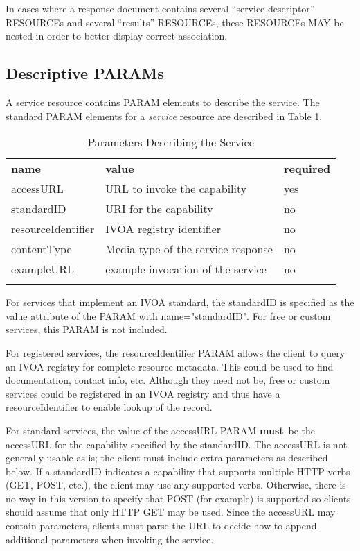 \documentclass[11pt,a4paper]{ivoa}
\newcommand{\attval}[2]{#1={\allowbreak}{"}#2{"}}
\newcommand{\rfcmust}{\textbf{must}}
\begin{document}
In cases where a response document contains several ``service descriptor'' RESOURCEs
and several ``results'' RESOURCEs, these RESOURCEs MAY be nested in
order to better display correct association.

\subsection{Descriptive PARAMs}

A service resource contains PARAM elements to describe the service.
The standard PARAM elements for a {\em service\/} resource
are described in Table \ref{tab:serviceParams}.

\begin{table}[h]
\begin{center}
\begin{tabular}{|l|l|l|}
\sptablerule
{\bf name}          &  {\bf value}                          & {\bf required}  \\
\sptablerule
accessURL           & URL to invoke the capability          &  yes  \\
standardID          & URI for the capability                &  no   \\
resourceIdentifier  & IVOA registry identifier              &  no   \\
contentType	        & Media type of the service response    & no \\
exampleURL          & example invocation of the service     & no \\
\sptablerule
\end{tabular}
\end{center}
\caption{Parameters Describing the Service}
\label{tab:serviceParams}
\end{table}

For services that implement an IVOA standard, the standardID is specified
as the value attribute of the PARAM with \attval{name}{standardID}.
For free or custom services, this PARAM is not included.

For registered services, the resourceIdentifier PARAM allows the client
to query an IVOA registry for complete resource metadata. This could be
used to find documentation, contact info, etc. Although they need not be,
free or custom services could be registered in an IVOA registry and thus
have a resourceIdentifier to enable lookup of the record.

For standard services, the value of the accessURL PARAM \rfcmust\ be the
accessURL for the capability specified by the standardID. The accessURL
is not generally usable as-is; the client must include extra parameters
as described below. If a standardID indicates a capability that supports
multiple HTTP verbs (GET, POST, etc.), the client may use any supported
verbs. Otherwise, there is no way in this version to specify that POST
(for example) is supported so clients should assume that only HTTP GET
may be used. Since the accessURL may contain parameters, clients must
parse the URL to decide how to append additional parameters when
invoking the service.
\end{document}
